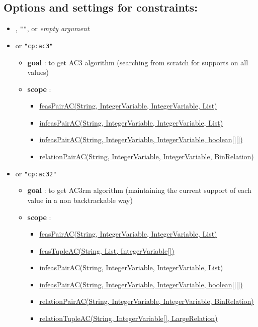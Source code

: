 \subsection{Options and settings for constraints:}
	\begin{itemize}	
		\item {}, \texttt{""}, or \textit{empty argument}
		\item \label{cext3:cext3options}\hypertarget{cext3:cext3options}{}
		 or \texttt{"cp:ac3"}
		\begin{itemize}
				\item \textbf{goal} : to get AC3 algorithm (searching from scratch for supports on all values)
				\item \textbf{scope} : 
					\begin{itemize}
						\item \hyperlink{feaspairac:feaspairacconstraint}{feasPairAC(String, IntegerVariable, IntegerVariable, List)}
						\item \hyperlink{infeaspairac:infeaspairacconstraint}{infeasPairAC(String, IntegerVariable, IntegerVariable, List)}
						\item \hyperlink{infeaspairac:infeaspairacconstraint}{infeasPairAC(String, IntegerVariable, IntegerVariable, boolean[][])}
						\item \hyperlink{relationpairac:relationpairacconstraint}{relationPairAC(String, IntegerVariable, IntegerVariable, BinRelation)}
					\end{itemize}
		\end{itemize}
		\item \label{cext32:cext32options}\hypertarget{cext32:cext32options}{}
		 or \texttt{"cp:ac32"}
		\begin{itemize}
				\item \textbf{goal} : to get AC3rm algorithm (maintaining the current support of each value in a non backtrackable way)
				\item \textbf{scope} : 
					\begin{itemize}
						\item \hyperlink{feaspairac:feaspairacconstraint}{feasPairAC(String, IntegerVariable, IntegerVariable, List)}
						\item \hyperlink{feastupleac:feastupleacconstraint}{feasTupleAC(String, List, IntegerVariable[])}
						\item \hyperlink{infeaspairac:infeaspairacconstraint}{infeasPairAC(String, IntegerVariable, IntegerVariable, List)}					
						\item \hyperlink{infeaspairac:infeaspairacconstraint}{infeasPairAC(String, IntegerVariable, IntegerVariable, boolean[][])}
						\item \hyperlink{relationpairac:relationpairacconstraint}{relationPairAC(String, IntegerVariable, IntegerVariable, BinRelation)}	
						\item \hyperlink{relationtupleac:relationtupleacconstraint}{relationTupleAC(String, IntegerVariable[], LargeRelation)}
					\end{itemize}	


\end{itemize}
\end{itemize}
